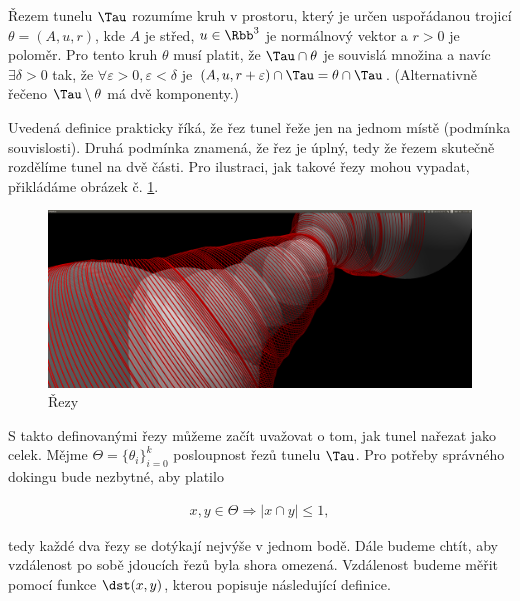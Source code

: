\begin{defi}
Řezem tunelu $ \Tau $ rozumíme kruh v prostoru, který je určen uspořádanou trojicí
$\theta = (A, u, r)$, kde $ A $ je střed, $ u \in \Rbb^3 $ je normálnový vektor a $ r > 0 $ je poloměr.
Pro tento kruh $ \theta $ musí platit, že $ \Tau \cap \theta $ je souvislá množina a navíc
$ \exists \delta > 0 $ tak, že $ \forall \varepsilon > 0,  \varepsilon < \delta $ je
$ (A, u, r + \varepsilon) \cap \Tau = \theta \cap \Tau $.
(Alternativně řečeno $\Tau \setminus \theta $ má dvě komponenty.)
\end{defi}

Uvedená definice prakticky říká, že řez tunel řeže jen na jednom místě (podmínka souvislosti).
Druhá podmínka znamená, že řez je úplný, tedy že řezem skutečně rozdělíme tunel na dvě části.
Pro ilustraci, jak takové řezy mohou vypadat, přikládáme obrázek č. \ref{fig:tunnel_cuts}.
\begin{figure}[ht]
    \centering
    \includegraphics[width=\textwidth]{img/simple_cuts.png}
    \caption{Řezy}
  \centering
  \label{fig:tunnel_cuts}
\end{figure}

S takto definovanými řezy můžeme začít uvažovat o tom, jak tunel nařezat jako celek.
Mějme $ \Theta = \{\theta_i\}_{i=0}^{k}$ posloupnost řezů tunelu $ \Tau $. Pro potřeby správného
dokingu bude nezbytné, aby platilo

\begin{align}
x, y \in \Theta \Rightarrow |x \cap y| \leq 1, \label{cond:not_intersecting}
\end{align}

tedy každé dva řezy se dotýkají nejvýše v jednom bodě. Dále budeme chtít, aby vzdálenost
po sobě jdoucích řezů byla shora omezená. Vzdálenost budeme měřit pomocí funkce
$ \dst(x, y) $, kterou popisuje následující definice.

